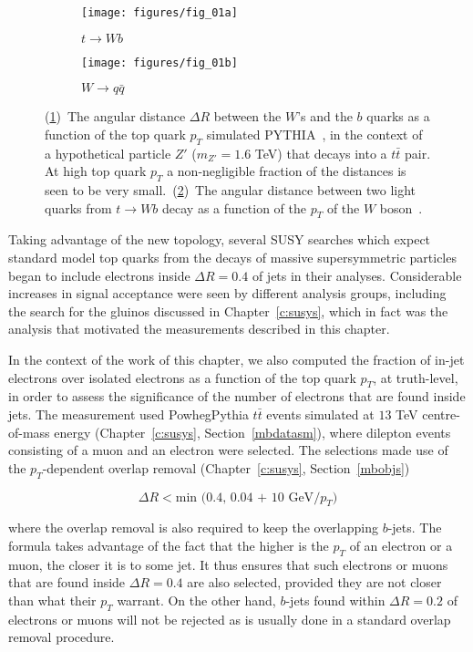 \begin{figure}[H]

	\begin{subfigure}{0.5\textwidth}
		\texttt{[image: figures/fig\_01a]}
		\caption{$t\to Wb$}
		\label{drwbtoppta}
	\end{subfigure}
	\begin{subfigure}{0.5\textwidth}
		\texttt{[image: figures/fig\_01b]}
		\caption{$W\to q\bar{q}$}
		\label{drwbtopptb}
	\end{subfigure}

	\centering
	\caption{(\ref{drwbtoppta})~The angular distance $\Delta R$ between
		the $W$'s and the $b$ quarks as a function of the top quark $p_T$ simulated
		PYTHIA~\cite{sjostrand:ch7}, in the context of a hypothetical particle $Z'$
		($m_{Z'}=1.6$ TeV) that decays into a $t\bar{t}$ pair. At high top quark $p_T$
		a non-negligible fraction of the distances is seen to be very
		small.~(\ref{drwbtopptb})~The angular distance between two light quarks from
		$t\to Wb$ decay as a function of the $p_T$ of the $W$ boson~\cite{bdis-figs}.}
	\label{f:drwbtoppt}
\end{figure}


Taking advantage of the new topology, several SUSY searches which expect
standard model top quarks from the decays of massive supersymmetric particles
began to include electrons inside $\Delta R = 0.4$ of jets in their analyses.
Considerable increases in signal acceptance were seen by different analysis
groups, including the search for the gluinos discussed in
Chapter~\ref{c:susys}, which in fact was the analysis that motivated the
measurements described in this chapter.


In the context of the work of this chapter, we also computed the fraction of
in-jet electrons over isolated electrons as a function of the top quark $p_T$,
at truth-level, in order to assess the significance of the number of electrons
that are found inside jets. The measurement used PowhegPythia $t\bar{t}$ events
simulated at $13$ TeV centre-of-mass energy (Chapter~\ref{c:susys},
Section~\ref{mbdatasm}), where dilepton events consisting of a muon and an
electron were selected. The selections made use of the $p_T$-dependent overlap
removal (Chapter~\ref{c:susys}, Section~\ref{mbobjs})

$$ \Delta R <  \text{min (0.4, 0.04 + 10 GeV} / p_T) $$

where the overlap removal is also required to keep the overlapping $b$-jets.
The formula takes advantage of the fact that the higher is the $p_T$ of an
electron or a muon, the closer it is to some jet. It thus ensures that such
electrons or muons that are found inside $\Delta R = 0.4$ are also selected,
provided they are not closer than what their $p_T$ warrant. On the other hand,
$b$-jets found within $\Delta R = 0.2$ of electrons or muons will not be
rejected as is usually done in a standard overlap removal procedure.

